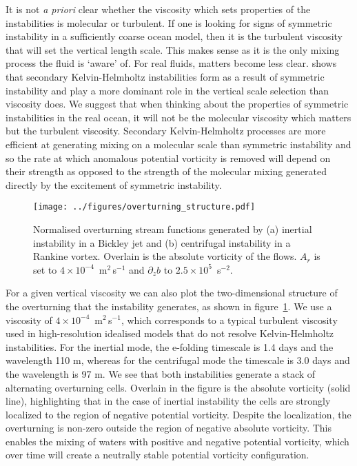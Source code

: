 It is not \textit{a priori} clear whether the viscosity which sets properties of the instabilities is molecular or turbulent. If one is looking for signs of symmetric instability in a sufficiently coarse ocean model, then it is the turbulent viscosity that will set the vertical length scale. This makes sense as it is the only mixing process the fluid is `aware' of. For real fluids, matters become less clear. \citet{Griffiths2003a} shows that secondary Kelvin-Helmholtz instabilities form as a result of symmetric instability and play a more dominant role in the vertical scale selection than viscosity does. We suggest that when thinking about the properties of symmetric instabilities in the real ocean, it will not be the molecular viscosity which matters but the turbulent viscosity. Secondary Kelvin-Helmholtz processes are more efficient at generating mixing on a molecular scale than symmetric instability and so the rate at which anomalous potential vorticity is removed will depend on their strength as opposed to the strength of the molecular mixing generated directly by the excitement of symmetric instability.

\begin{figure}[t]
    \centering
    \texttt{[image: ../figures/overturning\_structure.pdf]}
    \caption{Normalised overturning stream functions generated by (a) inertial instability in a Bickley jet and (b) centrifugal instability in a Rankine vortex. Overlain is the absolute vorticity of the flows. $A_r$ is set to $4 \times 10^{-4}$~m$^2\,$s$^{-1}$ and $\partial_z b$ to $2.5 \times 10^5$~s$^{-2}$.}
    \label{fig:2DStructure}
\end{figure}

For a given vertical viscosity we can also plot the two-dimensional structure of the overturning that the instability generates, as shown in figure~\ref{fig:2DStructure}. We use a viscosity of $4 \times 10 ^{-4}$~m$^2$\,s$^{-1}$, which corresponds to a typical turbulent viscosity used in high-resolution idealised models that do not resolve Kelvin-Helmholtz instabilities. For the inertial mode, the e-folding timescale is 1.4 days and the wavelength 110 m, whereas for the centrifugal mode the timescale is 3.0 days and the wavelength is 97 m. We see that both instabilities generate a stack of alternating overturning cells. Overlain in the figure is the absolute vorticity (solid line), highlighting that in the case of inertial instability the cells are strongly localized to the region of negative potential vorticity. Despite the localization, the overturning is non-zero outside the region of negative absolute vorticity. This enables the mixing of waters with positive and negative potential vorticity, which over time will create a neutrally stable potential vorticity configuration.

